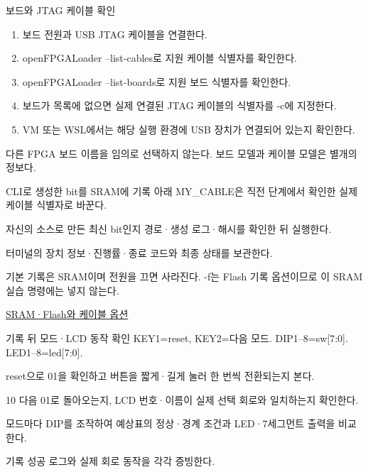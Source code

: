 \begin{frame}{보드와 JTAG 케이블 확인}\relax
\small
\begin{enumerate}\setlength{\itemsep}{0.22cm}
\item 보드 전원과 USB JTAG 케이블을 연결한다.
\item openFPGALoader --list-cables로 지원 케이블 식별자를 확인한다.
\item openFPGALoader --list-boards로 지원 보드 식별자를 확인한다.
\item 보드가 목록에 없으면 실제 연결된 JTAG 케이블의 식별자를 -c에 지정한다.
\item VM 또는 WSL에서는 해당 실행 환경에 USB 장치가 연결되어 있는지 확인한다.
\end{enumerate}
다른 FPGA 보드 이름을 임의로 선택하지 않는다. 보드 모델과 케이블 모델은 별개의 정보다.\par
\end{frame}

\begin{frame}{CLI로 생성한 bit를 SRAM에 기록}\relax
\small
아래 MY\_CABLE은 직전 단계에서 확인한 실제 케이블 식별자로 바꾼다.\par{}
자신의 소스로 만든 최신 bit인지 경로·생성 로그·해시를 확인한 뒤 실행한다.\par\vspace{0.22cm}터미널의 장치 정보·진행률·종료 코드와 최종 상태를 보관한다.\par\vspace{0.22cm}기본 기록은 SRAM이며 전원을 끄면 사라진다. -f는 Flash 기록 옵션이므로 이 SRAM 실습 명령에는 넣지 않는다.\par\href{https://trabucayre.github.io/openFPGALoader/guide/first-steps.html}{SRAM·Flash와 케이블 옵션}
\end{frame}

\begin{frame}{기록 뒤 모드·LCD 동작 확인}\relax
\small
KEY1=reset, KEY2=다음 모드. DIP1–8=sw[7:0]. LED1–8=led[7:0].\par\vspace{0.22cm}reset으로 01을 확인하고 버튼을 짧게·길게 눌러 한 번씩 전환되는지 본다.\par\vspace{0.22cm}10 다음 01로 돌아오는지, LCD 번호·이름이 실제 선택 회로와 일치하는지 확인한다.\par\vspace{0.22cm}모드마다 DIP를 조작하여 예상표의 정상·경계 조건과 LED·7세그먼트 출력을 비교한다.\par\vspace{0.22cm}기록 성공 로그와 실제 회로 동작을 각각 증빙한다.\par
\end{frame}

